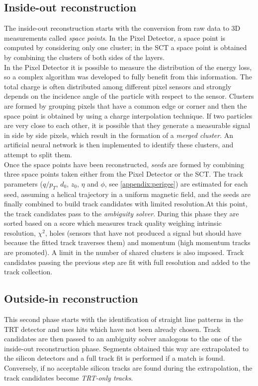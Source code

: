 \documentclass[a4paper,twoside,12pt]{book}
\begin{document}
\subsection*{Inside-out reconstruction}
The inside-out reconstruction starts with the conversion from raw data to 3D measurements called \textit{space points}. In the Pixel Detector, a space point is computed by
considering only one cluster; in the SCT a space point
is obtained by combining the clusters of both sides of the layers.  \\

In the Pixel Detector it is
possible to measure the distribution of the energy loss, so a complex algorithm was developed
to fully benefit from this information.  
The total charge is often distributed among different pixel sensors and strongly depends on the 
incidence angle of the particle with respect to the sensor. Clusters are formed by grouping 
pixels that have a common edge or corner and then the space point is obtained by using a 
charge interpolation technique. If two particles are very close to each other, it is possible
that they generate a measurable signal in side by side pixels, which result in the formation of
a \textit{merged cluster}. An artificial neural network is then implemented to identify these clusters, and attempt to split them.\\

Once the space points have been reconstructed, \textit{seeds} are formed by combining three space points taken either from the Pixel Detector or the SCT. The track parameters ($q/p_{T}$, $d_{0}$, $z_{0}$, $\eta$ and $\phi$, see \ref{appendix:perigee}) are estimated for each seed, assuming a helical trajectory in a 
uniform magnetic field, and the seeds are finally combined to build track candidates with limited resolution.At this point, the track candidates pass to the \textit{ambiguity solver}. During this
phase they are sorted based on a score which measures track quality
weighing intrinsic resolution, $\chi^2$, holes (sensors that have not produced a signal but 
should have because the fitted track traverses them) and momentum (high momentum tracks are 
promoted). A limit in the number of shared clusters is also imposed. Track candidates passing the previous step are fit with full resolution and added to the track collection.

\subsection*{Outside-in reconstruction}
This second phase starts with the identification of straight line patterns in the TRT detector
and uses hits which have not been already chosen. Track candidates are then passed to an ambiguity solver analogous to the one of the inside-out reconstruction phase. Segments obtained this way are extrapolated to the silicon detectors and a full track fit is performed if a match is found. Conversely, if no acceptable silicon tracks are found during 
the extrapolation, the track candidates become \textit{TRT-only tracks}. \\
\end{document}
